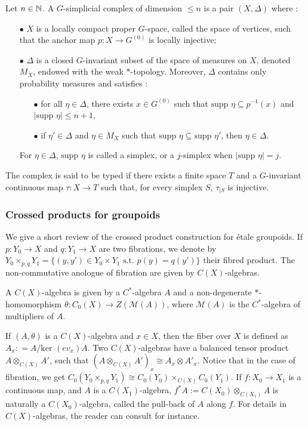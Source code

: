 \begin{definition} \label{Gcomplex}
Let $n\in\mathbb N$. A $G$-simplicial complex of dimension $\leq n$ is a pair $(X,\Delta)$ where :
\begin{itemize}
\item[$\bullet$] $X$ is a locally compact proper $G$-space, called the space of vertices, such that the anchor map $p : X\rightarrow G^{(0)}$ is locally injective;
\item[$\bullet$] $\Delta$ is a closed $G$-invariant subset of the space of measures on $X$, denoted $M_X$, endowed with the weak $*$-topology. Moreover, $\Delta$ contains only probability measures and satisfies :
\begin{itemize}
\item[$\bullet$] for all $\eta\in\Delta$, there exists $x\in G^ {(0)}$ such that $\text{supp }\eta \subseteq p^{-1}(x)$ and $|\text{supp }\eta|\leq n+1$,
\item[$\bullet$] if $\eta' \in \Delta$ and $\eta\in M_X$ such that $\text{supp }\eta \subseteq \text{supp }\eta'$, then $\eta\in \Delta$.
\end{itemize}
For $\eta\in \Delta$, $\text{supp }\eta$ is called a simplex, or a $j$-simplex when $|\text{supp }\eta | = j$.
\end{itemize}
The complex is said to be typed if there exists a finite space $T$ and a $G$-invariant continuous map $\tau : X\rightarrow T$ such that, for every simplex $S$, $\tau_{|S}$ is injective.  
\end{definition}

\subsubsection{Crossed products for groupoids}

We give a short review of the crossed product construction for étale groupoids. If $p : Y_0\rightarrow X$ and $q : Y_1\rightarrow X$ are two fibrations, we denote by $Y_0\times_{p,q} Y_1 = \{(y,y')\in Y_0\times Y_1 \text{ s.t. } p(y)=q(y')\}$ their fibred product. The non-commutative anologue of fibration are given by $C(X)$-algebras. 

\begin{definition}
A $C(X)$-algebra is given by a $C^*$-algebra $A$ and a non-degenerate $*$-homomorphism $\theta : C_0(X) \rightarrow Z(\mathcal M(A))$, where $\mathcal M(A)$ is the $C^*$-algebra of multipliers of $A$.
\end{definition}

If $(A,\theta)$ is a $C(X)$-algebra and $x\in X$, then the fiber over $X$ is defined as $A_x : = A/ \text{ker }(ev_x)A$. Two $C(X)$-algebras have a balanced tensor product $A\otimes_{C(X)} A'$, such that $(A\otimes_{C(X)} A')_x \cong A_x\otimes A'_x$. Notice that in the case of fibration, we get $C_0(Y_0\times_{p,q}Y_1) \cong C_0(Y_0)\times_{C(X)}C_0(Y_1)$. If $f:X_0 \rightarrow X_1$ is a continuous map, and $A$ is a $C(X_1)$-algebra, $f^* A :=C(X_0)\otimes_{C(X_1)} A$ is naturally a $C(X_0)$-algebra, called the pull-back of $A$ along $f$. For details in $C(X)$-algebras, the reader can consult \cite{blanchard} for instance. 
\\

